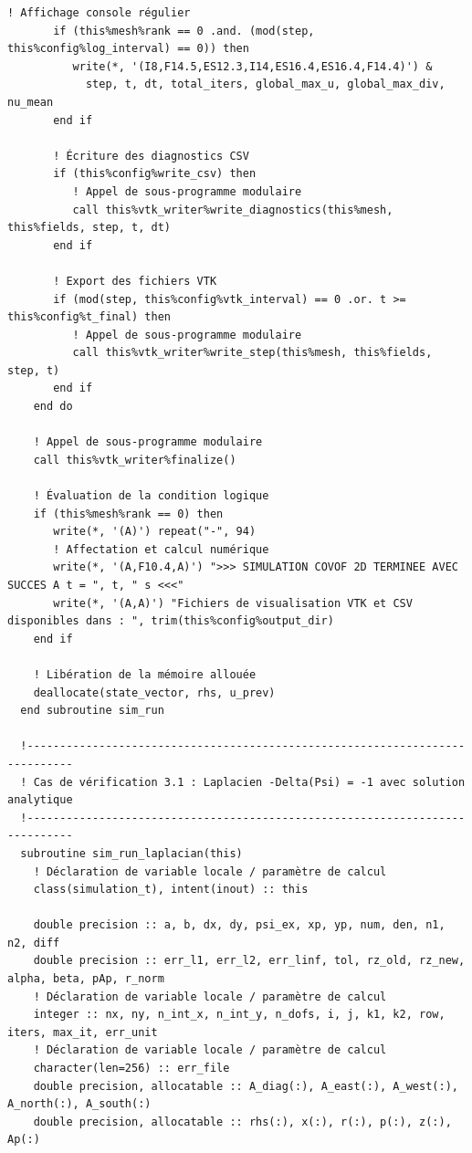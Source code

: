 \documentclass[10pt,a4paper,oneside]{book}
\begin{document}
\begin{lstlisting}[language={[95]Fortran}]
       ! Affichage console régulier
       if (this%mesh%rank == 0 .and. (mod(step, this%config%log_interval) == 0)) then
          write(*, '(I8,F14.5,ES12.3,I14,ES16.4,ES16.4,F14.4)') &
            step, t, dt, total_iters, global_max_u, global_max_div, nu_mean
       end if

       ! Écriture des diagnostics CSV
       if (this%config%write_csv) then
          ! Appel de sous-programme modulaire
          call this%vtk_writer%write_diagnostics(this%mesh, this%fields, step, t, dt)
       end if

       ! Export des fichiers VTK
       if (mod(step, this%config%vtk_interval) == 0 .or. t >= this%config%t_final) then
          ! Appel de sous-programme modulaire
          call this%vtk_writer%write_step(this%mesh, this%fields, step, t)
       end if
    end do

    ! Appel de sous-programme modulaire
    call this%vtk_writer%finalize()

    ! Évaluation de la condition logique
    if (this%mesh%rank == 0) then
       write(*, '(A)') repeat("-", 94)
       ! Affectation et calcul numérique
       write(*, '(A,F10.4,A)') ">>> SIMULATION COVOF 2D TERMINEE AVEC SUCCES A t = ", t, " s <<<"
       write(*, '(A,A)') "Fichiers de visualisation VTK et CSV disponibles dans : ", trim(this%config%output_dir)
    end if

    ! Libération de la mémoire allouée
    deallocate(state_vector, rhs, u_prev)
  end subroutine sim_run

  !-----------------------------------------------------------------------------
  ! Cas de vérification 3.1 : Laplacien -Delta(Psi) = -1 avec solution analytique
  !-----------------------------------------------------------------------------
  subroutine sim_run_laplacian(this)
    ! Déclaration de variable locale / paramètre de calcul
    class(simulation_t), intent(inout) :: this

    double precision :: a, b, dx, dy, psi_ex, xp, yp, num, den, n1, n2, diff
    double precision :: err_l1, err_l2, err_linf, tol, rz_old, rz_new, alpha, beta, pAp, r_norm
    ! Déclaration de variable locale / paramètre de calcul
    integer :: nx, ny, n_int_x, n_int_y, n_dofs, i, j, k1, k2, row, iters, max_it, err_unit
    ! Déclaration de variable locale / paramètre de calcul
    character(len=256) :: err_file
    double precision, allocatable :: A_diag(:), A_east(:), A_west(:), A_north(:), A_south(:)
    double precision, allocatable :: rhs(:), x(:), r(:), p(:), z(:), Ap(:)


\end{lstlisting}
\end{document}
